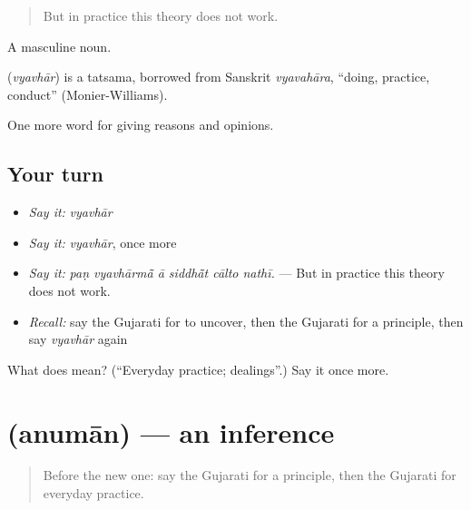 \begin{quote}
But in practice this theory does not work.
\end{quote}

A masculine noun.

\begin{cousinweb}
\textbf{} (\emph{vyavhār}) is a tatsama, borrowed from Sanskrit \emph{vyavahāra}, \textquotedblleft{}doing, practice, conduct\textquotedblright{} (Monier-Williams).
\end{cousinweb}

\begin{grammarlens}[title={What you've built}]
One more word for giving reasons and opinions.
\end{grammarlens}

\subsection*{Your turn}
\begin{itemize}
\raggedright
  \item \emph{Say it:} \emph{vyavhār}
  \item \emph{Say it:} \emph{vyavhār}, once more
  \item \emph{Say it:} \emph{paṇ vyavhārmā̃ ā siddhā̃t cālto nathī.} — But in practice this theory does not work.
  \item \emph{Recall:} say the Gujarati for to uncover, then the Gujarati for a principle, then say \emph{vyavhār} again
\end{itemize}

\begin{tcolorbox}[breakable,colback=teal!4,colframe=teal!35!black,title={Before you move on}]
What does  mean? (\textquotedblleft{}Everyday practice; dealings\textquotedblright{}.) Say it once more.
\end{tcolorbox}
\section[\texorpdfstring{\gu{અનુમાન} (anumān)}{અનુમાન (anumān)}]{ (anumān) — an inference}

\label{lesson:GU-C365-anuman}



\begin{quote}
Before the new one: say the Gujarati for a principle, then the Gujarati for everyday practice.
\end{quote}

